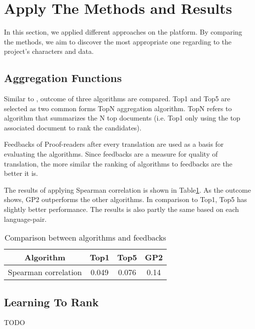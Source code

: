 \section{Apply The Methods and Results}
\label{sec:apply}
In this section, we applied different approaches on the platform. By comparing the methods, we aim to discover the most appropriate one regarding to the project's characters and data.

\subsection{Aggregation Functions}
Similar to \cite{agg-gp2}, outcome of three algorithms are compared. Top1 and Top5 are selected as two common forms TopN aggregation algorithm. TopN refers to algorithm that summarizes the N top documents (i.e. Top1 only using the top associated document to rank the candidates).

Feedbacks of Proof-readers after every translation are used as a basis for evaluating the algorithms. Since feedbacks are a measure for quality of translation, the more similar the ranking of algorithms to feedbacks are the better it is.

The results of applying Spearman correlation is shown in Table\ref{table:Spearman}. As the outcome shows, GP2 outperforms the other algorithms. In comparison to Top1, Top5 has slightly better performance. The results is also partly the same based on each language-pair.

\begin{table}
\begin{center}
\begin{tabular}{|c|c|c|c|}
\hline Algorithm & Top1 & Top5 & GP2  \\
\hline Spearman correlation & 0.049 & 0.076 & 0.14\\
\hline
\end{tabular}
\caption{Comparison between algorithms and feedbacks}
\label{table:Spearman}
\end{center}
\end{table}

\subsection{Learning To Rank}
TODO